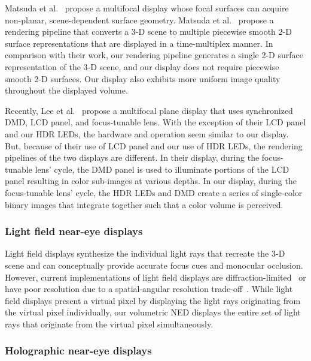 Matsuda et al.~\cite{Matsuda2017focal} propose a multifocal display whose focal surfaces can acquire non-planar, scene-dependent surface geometry. Matsuda et al.~\cite{Matsuda2017focal} propose a rendering pipeline that converts a 3-D scene to multiple piecewise smooth 2-D surface representations that are displayed in a time-multiplex manner. In comparison with their work, our rendering pipeline generates a single 2-D surface representation of the 3-D scene, and our display does not require piecewise smooth 2-D surfaces. Our display also exhibits more uniform image quality throughout the displayed volume. 

Recently, Lee et al.~\cite{Lee2018Tomoreal,Lee2018Shape} propose a multifocal plane display that uses synchronized DMD, LCD panel, and focus-tunable lens. With the exception of their LCD panel and our HDR LEDs, the hardware and operation seem similar to our display. But, because of their use of LCD panel and our use of HDR LEDs, the rendering pipelines of the two displays are different. In their display, during the focus-tunable lens' cycle, the DMD panel is used to illuminate portions of the LCD panel resulting in color sub-images at various depths. In our display, during the focus-tunable lens' cycle, the HDR LEDs and DMD create a series of single-color binary images that integrate together such that a color volume is perceived. 


\subsubsection{Light field near-eye displays}
\label{sec:volumetric:light_field_displays}
Light field displays synthesize the individual light rays that recreate the 3-D scene and can conceptually provide accurate focus cues and monocular occlusion. However, current implementations of light field displays are diffraction-limited~\cite{Maimone2014Pinlight,Huang2015Light} or have poor resolution due to a spatial-angular resolution trade-off~\cite{Lanman2013near,Hua2014Three}. While light field displays present a virtual pixel by displaying the light rays originating from the virtual pixel individually, our volumetric NED displays the entire set of light rays that originate from the virtual pixel simultaneously.

\subsubsection{Holographic near-eye displays}
\label{sec:volumetric:holographic_displays}


